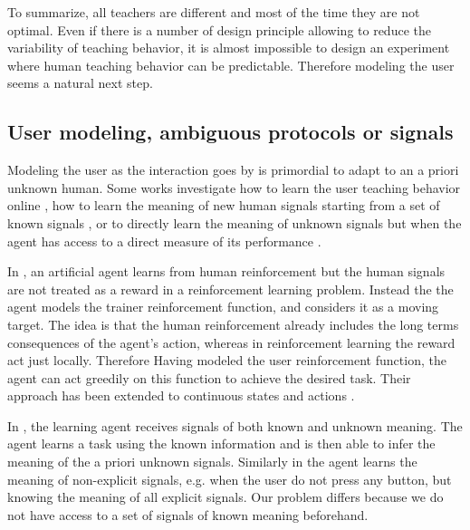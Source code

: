 \transition

To summarize, all teachers are different and most of the time they are not optimal. Even if there is a number of design principle allowing to reduce the variability of teaching behavior, it is almost impossible to design an experiment where human teaching behavior can be predictable. Therefore modeling the user seems a natural next step.

\subsection{User modeling, ambiguous protocols or signals}


Modeling the user as the interaction goes by is primordial to adapt to an a priori unknown human. Some works investigate how to learn the user teaching behavior online \cite{knox2009interactively}, how to learn the meaning of new human signals starting from a set of known signals \cite{macl11simul,loftinlearning}, or to directly learn the meaning of unknown signals but when the agent has access to a direct measure of its performance \cite{branavan2011learning,kim2012unsupervised,doshi2008spoken}.

In \cite{knox2009interactively}, an artificial agent learns from human reinforcement but the human signals are not treated as a reward in a reinforcement learning problem. Instead the the agent models the trainer reinforcement function, and considers it as a moving target. The idea is that the human reinforcement already includes the long terms consequences of the agent's action, whereas in reinforcement learning the reward act just locally. Therefore Having modeled the user reinforcement function, the agent can act greedily on this function to achieve the desired task. Their approach has been extended to continuous states and actions \cite{vien2013learning}.

In \cite{macl11simul}, the learning agent receives signals of both known and unknown meaning. The agent learns a task using the known information and is then able to infer the meaning of the a priori unknown signals. Similarly in \cite{loftinlearning} the agent learns the meaning of non-explicit signals, e.g. when the user do not press any button, but knowing the meaning of all explicit signals. Our problem differs because we do not have access to a set of signals of known meaning beforehand.

